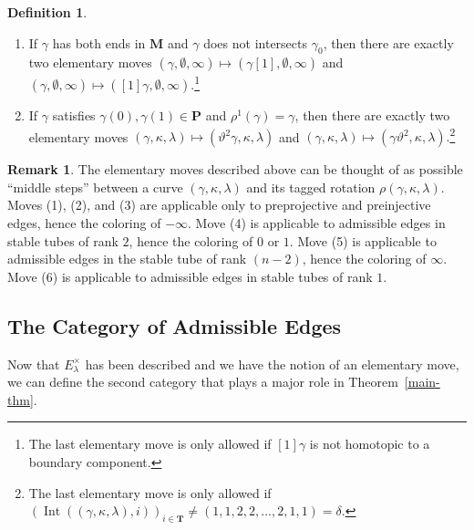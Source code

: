 \documentclass[11pt]{amsart}
\theoremstyle{plain}
\theoremstyle{definition}
\newtheorem{definition}[theorem]{Definition}
\newtheorem{remark}[theorem]{Remark}
\numberwithin{equation}{section}
\def\TT{\mathbf{T}}
\def\PP{\mathbf{P}}
\def\MM{\mathbf{M}}
\newcommand{\Int}{\operatorname{Int}}
\begin{document}
\begin{definition}
\begin{enumerate}
        In this case, $\lambda \in \{ 0,1\}.$
        \item If $\gamma$ has both ends in $\MM$ and $\gamma$ does not intersects $\gamma_0$, then there are exactly two elementary moves $( \gamma, \emptyset, \infty ) \mapsto ( \gamma[1], \emptyset, \infty )$ and $( \gamma, \emptyset, \infty ) \mapsto ( [1]\gamma, \emptyset, \infty ).$\footnote{The last elementary move is only allowed if $[1]\gamma$ is not homotopic to a boundary component.}
        \item If $\gamma$ satisfies $\gamma(0), \gamma(1) \in \PP$ and $\rho^1(\gamma) = \gamma$, then there are exactly two elementary moves $( \gamma, \kappa, \lambda ) \mapsto ( \vartheta^2\gamma, \kappa, \lambda )$ and $( \gamma, \kappa, \lambda ) \mapsto ( \gamma\vartheta^2, \kappa, \lambda ).$\footnote{The last elementary move is only allowed if $(\Int((\gamma,\kappa, \lambda), i ))_{i \in \TT} \neq (1,1,2,2,\ldots,2,1,1) = \delta.$}
    \end{enumerate}
\end{definition}

\begin{remark}
    The elementary moves described above can be thought of as possible ``middle steps'' between a curve $(\gamma,\kappa, \lambda)$ and its tagged rotation $\rho(\gamma,\kappa, \lambda)$.
    Moves (1), (2), and (3) are applicable only to preprojective and preinjective edges, hence the coloring of $-\infty$.
    Move (4) is applicable to admissible edges in stable tubes of rank $2$, hence the coloring of $0$ or $1$.
    Move (5) is applicable to admissible edges in the stable tube of rank $(n-2)$, hence the coloring of $\infty$.
    Move (6) is applicable to admissible edges in stable tubes of rank $1$.
\end{remark}


\subsection{The Category of Admissible Edges}\label{sec-edge-category}
Now that $E^\times_\lambda$ has been described and we have the notion of an elementary move, we can define the second category that plays a major role in Theorem~\ref{main-thm}.
\end{document}
